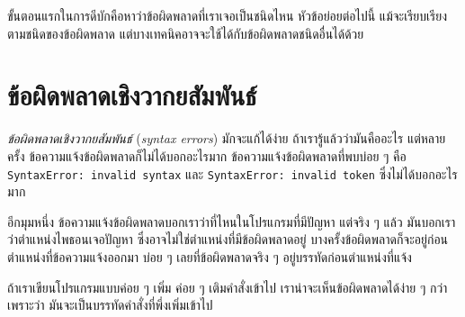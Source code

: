 
ขั้นตอนแรกในการดีบักคือหาว่าข้อผิดพลาดที่เราเจอเป็นชนิดไหน
หัวข้อย่อยต่อไปนี้ แม้จะเรียบเรียงตามชนิดของข้อผิดพลาด 
แต่บางเทคนิคอาจจะใช้ได้กับข้อผิดพลาดชนิดอื่นได้ด้วย

\section{ข้อผิดพลาดเชิงวากยสัมพันธ์}


\textit{ข้อผิดพลาดเชิงวากยสัมพันธ์} (\textit{syntax errors}) มักจะแก้ได้ง่าย ถ้าเรารู้แล้วว่ามันคืออะไร
แต่หลายครั้ง ข้อความแจ้งข้อผิดพลาดก็ไม่ได้บอกอะไรมาก
ข้อความแจ้งข้อผิดพลาดที่พบบ่อย ๆ คือ 
\texttt{SyntaxError: invalid syntax}
และ
\texttt{SyntaxError: invalid token} 
ซึ่งไม่ได้บอกอะไรมาก


อีกมุมหนึ่ง ข้อความแจ้งข้อผิดพลาดบอกเราว่าที่ไหนในโปรแกรมที่มีปัญหา
แต่จริง ๆ แล้ว มันบอกเราว่าตำแหน่งไพธอนเจอปัญหา ซึ่งอาจไม่ใช่ตำแหน่งที่มีข้อผิดพลาดอยู่
บางครั้งข้อผิดพลาดก็จะอยู่ก่อนตำแหน่งที่ข้อความแจ้งออกมา
บ่อย ๆ เลยที่ข้อผิดพลาดจริง ๆ อยู่บรรทัดก่อนตำแหน่งที่แจ้ง




ถ้าเราเขียนโปรแกรมแบบค่อย ๆ เพิ่ม ค่อย ๆ เติมคำสั่งเข้าไป
เราน่าจะเห็นข้อผิดพลาดได้ง่าย ๆ กว่า
เพราะว่า มันจะเป็นบรรทัดคำสั่งที่พึ่งเพิ่มเข้าไป

